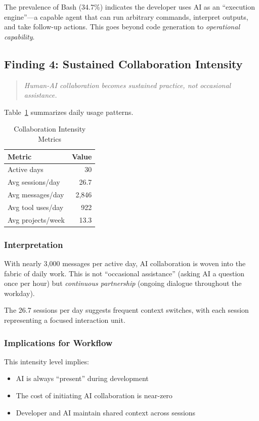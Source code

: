 \documentclass{ntlabs-preprint}
\begin{document}
The prevalence of Bash (34.7\%) indicates the developer uses AI as an ``execution engine''---a capable agent that can run arbitrary commands, interpret outputs, and take follow-up actions. This goes beyond code generation to \textit{operational capability}.

\subsection{Finding 4: Sustained Collaboration Intensity}

\begin{quote}
\textit{Human-AI collaboration becomes sustained practice, not occasional assistance.}
\end{quote}

Table~\ref{tab:intensity} summarizes daily usage patterns.

\begin{table}[h]
\centering
\caption{Collaboration Intensity Metrics}
\label{tab:intensity}
\begin{tabular}{lr}
\toprule
\textbf{Metric} & \textbf{Value} \\
\midrule
Active days & 30 \\
Avg sessions/day & 26.7 \\
Avg messages/day & 2,846 \\
Avg tool uses/day & 922 \\
Avg projects/week & 13.3 \\
\bottomrule
\end{tabular}
\end{table}

\subsubsection{Interpretation}

With nearly 3,000 messages per active day, AI collaboration is woven into the fabric of daily work. This is not ``occasional assistance'' (asking AI a question once per hour) but \textit{continuous partnership} (ongoing dialogue throughout the workday).

The 26.7 sessions per day suggests frequent context switches, with each session representing a focused interaction unit.

\subsubsection{Implications for Workflow}

This intensity level implies:
\begin{itemize}
    \item AI is always ``present'' during development
    \item The cost of initiating AI collaboration is near-zero
    \item Developer and AI maintain shared context across sessions
\end{itemize}
\end{document}
